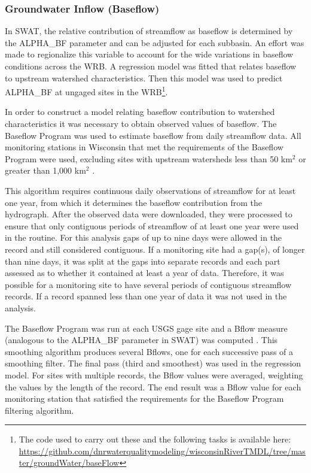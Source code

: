 \subsubsection{Groundwater Inflow (Baseflow)}\label{sec:baseflow}
	In SWAT, the relative contribution of streamflow as baseflow is determined by the ALPHA\_BF parameter and can be adjusted for each subbasin. An effort was made to regionalize this variable to account for the wide variations in baseflow conditions across the WRB. A regression model was fitted that relates baseflow to upstream watershed characteristics. Then this model was used to predict ALPHA\_BF at ungaged sites in the WRB\footnote{The code used to carry out these and the following tasks is available here: \url{https://github.com/dnrwaterqualitymodeling/wisconsinRiverTMDL/tree/master/groundWater/baseFlow}}.
	
	In order to construct a model relating baseflow contribution to watershed characteristics it was necessary to obtain observed values of baseflow. The Baseflow Program \citep{arnold_automated_1995} was used to estimate baseflow from daily streamflow data. All monitoring stations in Wisconsin  that met the requirements of the Baseflow Program were used, excluding sites with upstream watersheds less than 50 km$^2$ or greater than 1,000 km$^2$ \citep{arnold_regional_2000}.

	This algorithm requires continuous daily observations of streamflow for at least one year, from which it determines the baseflow contribution from the hydrograph.	After the observed data were downloaded, they were processed to ensure that only contiguous periods of streamflow of at least one year were used in the routine. For this analysis gaps of up to nine days were allowed in the record and still considered contiguous. If a monitoring site had a gap(s), of longer than nine days, it was split at the gaps into separate records and each part assessed as to whether it contained at least a year of data. Therefore, it was possible for a monitoring site to have several periods of contiguous streamflow records. If a record spanned less than one year of data it was not used in the analysis.
	
	The Baseflow Program was run at each USGS gage site and a Bflow measure (analogous to the ALPHA\_BF parameter in SWAT) was computed \citep{arnold_automated_1995}. This smoothing algorithm produces several Bflows, one for each successive pass of a smoothing filter. The final pass (third and smoothest) was used in the regression model. For sites with multiple records, the Bflow values were averaged, weighting the values by the length of the record. The end result was a Bflow value for each monitoring station that satisfied the requirements for the Baseflow Program filtering algorithm.  

